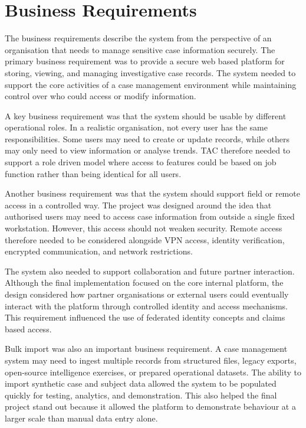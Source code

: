 \section{Business Requirements}

The business requirements describe the system from the perspective of an organisation that needs to manage sensitive case information securely. The primary business requirement was to provide a secure web based platform for storing, viewing, and managing investigative case records. The system needed to support the core activities of a case management environment while maintaining control over who could access or modify information.

A key business requirement was that the system should be usable by different operational roles. In a realistic organisation, not every user has the same responsibilities. Some users may need to create or update records, while others may only need to view information or analyse trends. TAC therefore needed to support a role driven model where access to features could be based on job function rather than being identical for all users.

Another business requirement was that the system should support field or remote access in a controlled way. The project was designed around the idea that authorised users may need to access case information from outside a single fixed workstation. However, this access should not weaken security. Remote access therefore needed to be considered alongside VPN access, identity verification, encrypted communication, and network restrictions.

The system also needed to support collaboration and future partner interaction. Although the final implementation focused on the core internal platform, the design considered how partner organisations or external users could eventually interact with the platform through controlled identity and access mechanisms. This requirement influenced the use of federated identity concepts and claims based access.

Bulk import was also an important business requirement. A case management system may need to ingest multiple records from structured files, legacy exports, open-source intelligence exercises, or prepared operational datasets. The ability to import synthetic case and subject data allowed the system to be populated quickly for testing, analytics, and demonstration. This also helped the final project stand out because it allowed the platform to demonstrate behaviour at a larger scale than manual data entry alone.

